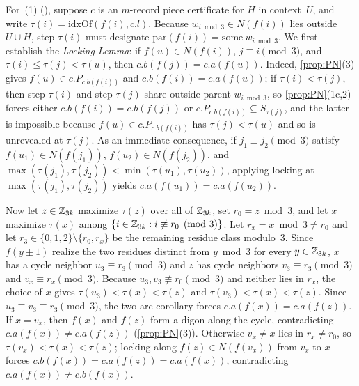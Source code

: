 \begin{outline}
For~(1) (), suppose $c$ is an $m$-record piece certificate for $H$ in context~$U$, and write
$\tau(i) = \mathrm{idxOf}(f(i), c.l)$. Because $w_{i \bmod 3} \in N(f(i))$ lies outside $U \cup H$, step $\tau(i)$ must
designate $\mathrm{par}(f(i)) = \mathrm{some}\ w_{i \bmod 3}$. We first establish the \emph{Locking Lemma}: if
$f(u) \in N(f(i))$, $j \equiv i \pmod 3$, and $\tau(i) \le \tau(j) < \tau(u)$, then $c.b(f(j)) = c.a(f(u))$. Indeed,
\cref{prop:PN}(3) gives $f(u) \in c.P_{c.b(f(i))}$ and $c.b(f(i)) = c.a(f(u))$; if $\tau(i) < \tau(j)$, then step $\tau(i)$
and step $\tau(j)$ share outside parent $w_{i \bmod 3}$, so \cref{prop:PN}(1c,2) forces either $c.b(f(i)) = c.b(f(j))$ or
$c.P_{c.b(f(i))} \subseteq S_{\tau(j)}$, and the latter is impossible because $f(u) \in c.P_{c.b(f(i))}$ has $\tau(j) <
\tau(u)$ and so is unrevealed at $\tau(j)$. As an immediate consequence, if $j_1 \equiv j_2 \pmod 3$ satisfy
$f(u_1) \in N(f(j_1))$, $f(u_2) \in N(f(j_2))$, and $\max(\tau(j_1), \tau(j_2)) < \min(\tau(u_1), \tau(u_2))$, applying
locking at $\max(\tau(j_1), \tau(j_2))$ yields $c.a(f(u_1)) = c.a(f(u_2))$.

Now let $z \in \mathbb{Z}_{3k}$ maximize $\tau(z)$ over all of $\mathbb{Z}_{3k}$, set $r_0 = z \bmod 3$, and let $x$ maximize $\tau(x)$
among $\{i \in \mathbb{Z}_{3k} : i \not\equiv r_0 \pmod 3\}$. Let $r_x = x \bmod 3 \ne r_0$ and let $r_3 \in \{0,1,2\} \setminus
\{r_0, r_x\}$ be the remaining residue class modulo~$3$. Since $f(y \pm 1)$ realize the two residues distinct from
$y \bmod 3$ for every $y \in \mathbb{Z}_{3k}$, $x$ has a cycle neighbor $u_3 \equiv r_3 \pmod 3$ and $z$ has cycle neighbors
$v_3 \equiv r_3 \pmod 3$ and $v_x \equiv r_x \pmod 3$. Because $u_3, v_3 \not\equiv r_0 \pmod 3$ and neither lies in
$r_x$, the choice of $x$ gives $\tau(u_3) < \tau(x) < \tau(z)$ and $\tau(v_3) < \tau(x) < \tau(z)$. Since
$u_3 \equiv v_3 \equiv r_3 \pmod 3$, the two-arc corollary forces $c.a(f(x)) = c.a(f(z))$. If $x = v_x$, then $f(x)$ and
$f(z)$ form a digon along the cycle, contradicting $c.a(f(x)) \ne c.a(f(z))$ (\cref{prop:PN}(3)). Otherwise $v_x \ne x$
lies in $r_x \ne r_0$, so $\tau(v_x) < \tau(x) < \tau(z)$; locking along $f(z) \in N(f(v_x))$ from $v_x$ to $x$ forces
$c.b(f(x)) = c.a(f(z)) = c.a(f(x))$, contradicting $c.a(f(x)) \ne c.b(f(x))$.


\end{outline}
